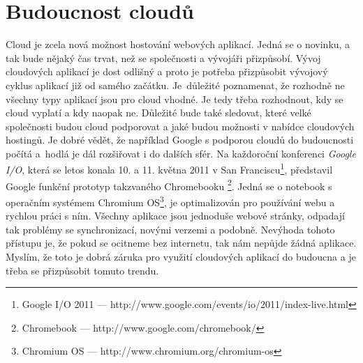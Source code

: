 \section{Budoucnost cloudů}
Cloud je zcela nová možnost hostování webových aplikací. Jedná se o novinku, a tak bude nějaký čas trvat, než se společnosti a vývojáři přizpůsobí. Vývoj cloudových aplikací je dost odlišný a proto je potřeba přizpůsobit vývojový cyklus aplikací již od samého začátku. Je~důležité poznamenat, že rozhodně ne všechny typy aplikací jsou pro cloud vhodné. Je tedy třeba rozhodnout, kdy se cloud vyplatí a kdy naopak ne. Důležité bude také sledovat, které velké společnosti budou cloud podporovat a jaké budou možnosti v nabídce cloudových hostingů. Je dobré vědět, že například Google s podporou cloudů do budoucnosti počítá a~hodlá je dál rozšiřovat i do dalších sfér. Na každoroční konferenci \emph{Google I/O}, která se letos konala 10. a 11. května 2011 v San Franciscu\footnote{Google I/O 2011 --- http://www.google.com/events/io/2011/index-live.html}, představil Google funkční prototyp takzvaného Chromebooku \footnote{Chromebook --- http://www.google.com/chromebook/}. Jedná se o notebook s operačním systémem Chromium OS\footnote{Chromium OS --- http://www.chromium.org/chromium-os}, je optimalizován pro používání webu a rychlou práci s ním. Všechny aplikace jsou jednoduše webové stránky, odpadají tak problémy se synchronizací, novými verzemi a podobně. Nevýhoda tohoto přístupu je, že pokud se ocitneme bez internetu, tak nám nepůjde žádná aplikace. Myslím, že toto je dobrá záruka pro využití cloudových aplikací do budoucna a je třeba se přizpůsobit tomuto trendu.
